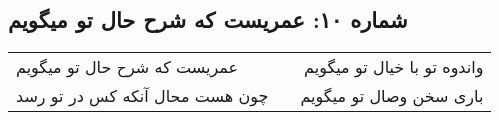 \begin{center}
\section*{شماره ۱۰: عمریست که شرح حال تو میگویم}
\label{sec:010}
\begin{longtable}{l p{0.5cm} r}
عمریست که شرح حال تو میگویم
&&
واندوه تو با خیال تو میگویم
\\
چون هست محال آنکه کس در تو رسد
&&
باری سخن وصال تو میگویم
\\
\end{longtable}
\end{center}
